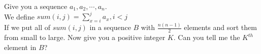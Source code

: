 Give you a sequence $a_{1},a_{2}, \cdots , a_{n}$.\\
We define $sum(i,j) = \sum_{x=i}^{j}a_{x},i < j$\\
If we put all of $sum(i,j)$ in a sequence $B$ with $\frac{n(n-1)}{2}$ elements and sort them from small to large. Now give you a positive integer $K$. Can you tell me the $K^{th}$ element in $B$? 